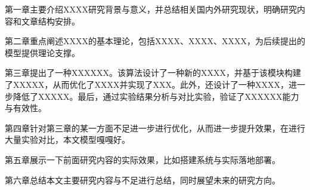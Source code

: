第一章主要介绍XXXX研究背景与意义，并总结相关国内外研究现状，明确研究内容和文章结构安排。


第二章重点阐述XXXX的基本理论，包括XXXX、XXXX、XXXX，为后续提出的模型提供理论支撑。


第三章提出了一种XXXXXX。该算法设计了一种新的XXXX，并基于该模块构建了XXXXX，从而优化了XXXX并实现了XXX。此外，还设计了一种XXXX，进一步降低了XXXXX。最后，通过实验结果分析与对比实验，验证了XXXXXX能力与有效性。


第四章针对第三章的某一方面不足进一步进行优化，从而进一步提升效果，在进行大量实验对比，本文模型嘎嘎好。

第五章展示一下前面研究内容的实际效果，比如搭建系统与实际落地部署。


第六章总结本文主要研究内容与不足进行总结，同时展望未来的研究方向。


